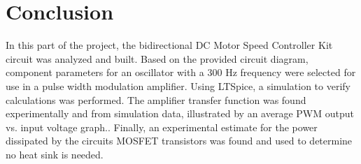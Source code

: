 \section{Conclusion}


In this part of the project, the bidirectional DC Motor Speed Controller Kit circuit was analyzed and built.
%
Based on the provided circuit diagram, component parameters for an oscillator with a 300 Hz frequency were selected for use in a pulse width modulation amplifier.
%
Using LTSpice, a simulation to verify calculations was performed.
%
The amplifier transfer function was found experimentally and from simulation data, illustrated by an average PWM output vs. input voltage graph..
%	
Finally, an experimental estimate for the power dissipated by the circuits MOSFET transistors was found and used to determine no heat sink is needed.
